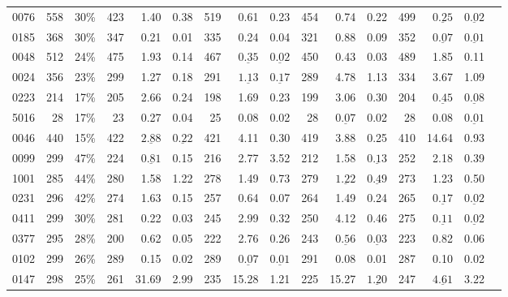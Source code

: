 \documentclass{article}
\begin{document}
\begin{table}[t]
\begin{tabular}{lrrrrrrrrrrrrrrr}
0076 & 558 & 30\% & 423 & 1.40 & 0.38 & 519 & 0.61 & 0.23 & 454 & 0.74 & 0.22 & 499 & $\underline{\mathbf{0.25}}$ & $\underline{\mathbf{0.02}}$\\
0185 & 368 & 30\% & 347 & 0.21 & 0.01 & 335 & 0.24 & 0.04 & 321 & 0.88 & 0.09 & 352 & $\underline{\mathbf{0.07}}$ & $\underline{\mathbf{0.01}}$\\
0048 & 512 & 24\% & 475 & 1.93 & 0.14 & 467 & $\underline{\mathbf{0.35}}$ & $\underline{\mathbf{0.02}}$ & 450 & 0.43 & 0.03 & 489 & 1.85 & 0.11\\
0024 & 356 & 23\% & 299 & 1.27 & 0.18 & 291 & $\underline{\mathbf{1.13}}$ & $\underline{\mathbf{0.17}}$ & 289 & 4.78 & 1.13 & 334 & 3.67 & 1.09\\
0223 & 214 & 17\% & 205 & 2.66 & 0.24 & 198 & 1.69 & 0.23 & 199 & 3.06 & 0.30 & 204 & $\underline{\mathbf{0.45}}$ & $\underline{\mathbf{0.08}}$\\
5016 & 28 & 17\% & 23 & 0.27 & 0.04 & 25 & 0.08 & 0.02 & 28 & $\underline{\mathbf{0.07}}$ & 0.02 & 28 & 0.08 & $\underline{\mathbf{0.01}}$\\
0046 & 440 & 15\% & 422 & $\underline{\mathbf{2.88}}$ & $\underline{\mathbf{0.22}}$ & 421 & 4.11 & 0.30 & 419 & 3.88 & 0.25 & 410 & 14.64 & 0.93\\
\midrule
0099 & 299 & 47\% & 224 & $\underline{\mathbf{0.81}}$ & 0.15 & 216 & 2.77 & 3.52 & 212 & 1.58 & $\underline{\mathbf{0.13}}$ & 252 & 2.18 & 0.39\\
1001 & 285 & 44\% & 280 & 1.58 & 1.22 & 278 & 1.49 & 0.73 & 279 & $\underline{\mathbf{1.22}}$ & $\underline{\mathbf{0.49}}$ & 273 & 1.23 & 0.50\\
0231 & 296 & 42\% & 274 & 1.63 & 0.15 & 257 & 0.64 & 0.07 & 264 & 1.49 & 0.24 & 265 & $\underline{\mathbf{0.17}}$ & $\underline{\mathbf{0.02}}$\\
0411 & 299 & 30\% & 281 & 0.22 & 0.03 & 245 & 2.99 & 0.32 & 250 & 4.12 & 0.46 & 275 & $\underline{\mathbf{0.11}}$ & $\underline{\mathbf{0.02}}$\\
0377 & 295 & 28\% & 200 & 0.62 & 0.05 & 222 & 2.76 & 0.26 & 243 & $\underline{\mathbf{0.56}}$ & $\underline{\mathbf{0.03}}$ & 223 & 0.82 & 0.06\\
0102 & 299 & 26\% & 289 & 0.15 & 0.02 & 289 & $\underline{\mathbf{0.07}}$ & $\underline{\mathbf{0.01}}$ & 291 & 0.08 & 0.01 & 287 & 0.10 & 0.02\\
0147 & 298 & 25\% & 261 & 31.69 & 2.99 & 235 & 15.28 & 1.21 & 225 & 15.27 & $\underline{\mathbf{1.20}}$ & 247 & $\underline{\mathbf{4.61}}$ & 3.22\\

\end{tabular}
\end{table}
\end{document}
